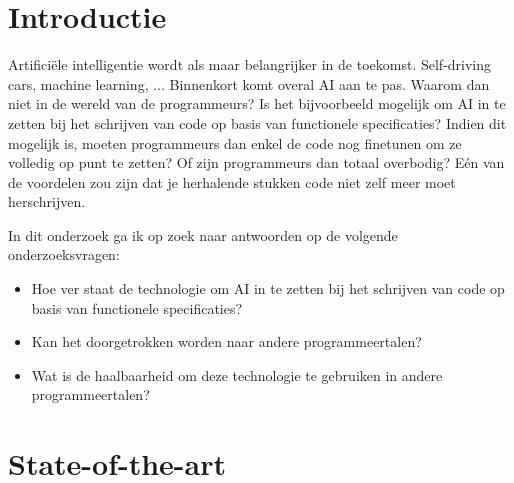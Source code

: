
\section{Introductie} %
\label{sec:introductie}




Artificiële intelligentie wordt als maar belangrijker in de toekomst. Self-driving cars, machine learning, ... Binnenkort komt overal AI aan te pas. Waarom dan niet in de wereld van de programmeurs? Is het bijvoorbeeld mogelijk om AI in te zetten bij het schrijven van code op basis van functionele specificaties? Indien dit mogelijk is, moeten programmeurs dan enkel de code nog finetunen om ze volledig op punt te zetten? Of zijn programmeurs dan totaal overbodig? Eén van de voordelen zou zijn dat je herhalende stukken code niet zelf meer moet herschrijven.

In dit onderzoek ga ik op zoek naar antwoorden op de volgende onderzoeksvragen:
\begin{itemize}
	\item Hoe ver staat de technologie om AI in te zetten bij het schrijven van code op basis van functionele specificaties?
	\item Kan het doorgetrokken worden naar andere programmeertalen?
	\item Wat is de haalbaarheid om deze technologie te gebruiken in andere programmeertalen?
\end{itemize}


\section{State-of-the-art}
\label{sec:state-of-the-art}

